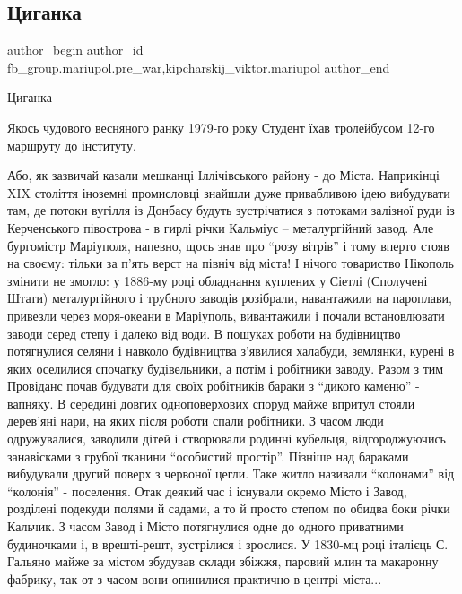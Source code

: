  
 
 
 
 

\subsection{Циганка}
\label{sec:13_01_2023.fb.fb_group.mariupol.pre_war.1.tsiganka}
 
\ifcmt
 author_begin
   author_id fb_group.mariupol.pre_war,kipcharskij_viktor.mariupol
 author_end
\fi

Циганка

Якось чудового весняного ранку 1979-го року Студент їхав  тролейбусом 12-го
маршруту до інституту. 

Або, як зазвичай казали мешканці Іллічівського району - до Міста. Наприкінці
XIX століття іноземні промисловці знайшли дуже привабливою ідею вибудувати там,
де потоки вугілля із Донбасу будуть зустрічатися з потоками залізної руди із
Керченського півострова - в гирлі річки Кальміус – металургійний завод. Але
бургомістр Маріуполя, напевно, щось знав про \enquote{розу вітрів} і тому вперто стояв
на своєму: тільки за п'ять верст на північ від міста! І нічого товариство
Нікополь змінити не змогло: у 1886-му році обладнання куплених у Сіетлі
(Сполучені Штати) металургійного і трубного заводів розібрали, навантажили на
пароплави, привезли через моря-океани в Маріуполь, вивантажили і почали
встановлювати заводи серед степу і далеко від води. В пошуках роботи на
будівництво потягнулися селяни і навколо будівництва з'явилися халабуди,
землянки, курені в яких оселилися спочатку будівельники, а потім і робітники
заводу. Разом з тим Провіданс почав будувати для своїх робітників бараки з
\enquote{дикого каменю} - вапняку. В середині довгих одноповерхових споруд майже
впритул стояли дерев'яні нари, на яких після роботи спали робітники. З часом
люди одружувалися, заводили дітей і створювали родинні кубельця,
відгороджуючись занавісками з грубої тканини \enquote{особистий простір}. Пізніше над
бараками вибудували другий поверх з червоної цегли. Таке житло називали
\enquote{колонами} від \enquote{колонія} - поселення. Отак деякий час і існували окремо Місто і
Завод, розділені подекуди полями й садами, а то й просто степом по обидва боки
річки Кальчик. З часом Завод і Місто потягнулися одне до одного приватними
будиночками і, в врешті-решт, зустрілися і зрослися. У 1830-мц році італієць С.
Гальяно майже за містом збудував склади збіжжя, паровий млин та макаронну
фабрику, так от з часом вони опинилися практично в центрі міста...

